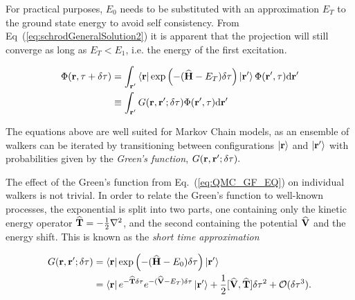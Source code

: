 For practical purposes, $E_0$ needs to be substituted with an approximation $E_T$ to the ground state energy to avoid self consistency. From Eq~(\ref{eq:schrodGeneralSolution2}) it is apparent that the projection will still converge as long as $E_T < E_1$, i.e. the energy of the first excitation.

\begin{align}
 \Phi(\mathbf{r}, \tau + \delta\tau) &= \int_{\mathbf{r}'}\left< \mathbf{r} \right|\exp\left(-({\bf\widehat{H}} - E_T)\delta\tau\right)\left| \mathbf{r}' \right>\Phi(\mathbf{r}', \tau)\mathrm{d}\mathbf{r}' \\
  &\equiv \int_{\mathbf{r}'}G(\mathbf{r}, \mathbf{r'}; \delta\tau)\Phi(\mathbf{r}', \tau)\mathrm{d}\mathbf{r}'  \label{eq:QMC_GF_EQ}
\end{align}

The equations above are well suited for Markov Chain models, as an ensemble of walkers can be iterated by transitioning between configurations $\left| \mathbf{r} \right>$ and $\left| \mathbf{r}' \right>$ with probabilities given by the \textit{Green's function}, $G(\mathbf{r}, \mathbf{r'}; \delta\tau).$

The effect of the Green's function from Eq.~(\ref{eq:QMC_GF_EQ}) on individual walkers is not trivial. In order to relate the Green's function to well-known processes, the exponential is split into two parts, one containing only the kinetic energy operator ${\bf\widehat{T}} = -\frac{1}{2}\nabla^2$, and the second containing the potential ${\bf\widehat{V}}$ and the energy shift. This is known as the \textit{short time approximation}\cite{abInitioMC}

\begin{align}
  G(\mathbf{r}, \mathbf{r'}; \delta\tau) &= \left< \mathbf{r} \right|\exp\left(-({\bf\widehat{H}} - E_0)\delta\tau\right)\left| \mathbf{r}' \right> \\
  &= \left< \mathbf{r} \right|e^{-{\bf\widehat{T}}\delta\tau}e^{-({\bf\widehat{V}} - E_T)\delta\tau}\left| \mathbf{r}' \right> + \frac{1}{2}[{\bf\widehat{V}}, {\bf\widehat{T}}]\delta\tau^2 + \mathcal{O}(\delta\tau^3).  \notag 
\end{align}


